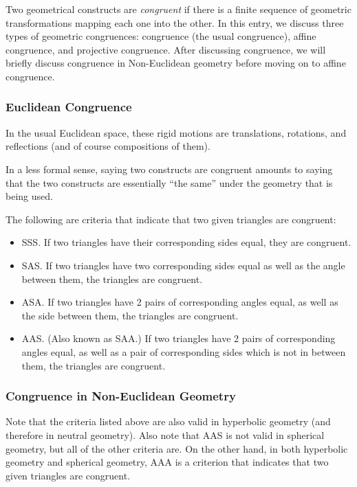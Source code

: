 \documentclass[12pt]{article}
\begin{document}

Two geometrical constructs are \emph{congruent} if there is a finite sequence of geometric transformations mapping each one into the other.  In this entry, we discuss three types of geometric congruences:  congruence (the usual congruence), affine congruence, and projective congruence.  After discussing  congruence, we will briefly discuss congruence in Non-Euclidean geometry before moving on to affine congruence.

\subsubsection*{Euclidean Congruence}
In the usual Euclidean space, these rigid motions are translations, rotations, and reflections (and of course compositions of them).

In a less formal sense, saying two constructs are congruent amounts to saying that the two constructs are essentially ``the same'' under the geometry that is being used.

The following are criteria that indicate that two given triangles are congruent:
\begin{itemize}
\item SSS. If two triangles have their corresponding sides equal, they are congruent.
\item SAS. If two triangles have two corresponding sides equal as well as the angle between them, the triangles are congruent.
\item ASA. If two triangles have 2 pairs of corresponding angles equal, as well as the side between them, the triangles are congruent.
\item AAS. (Also known as SAA.) If two triangles have 2 pairs of corresponding angles equal, as well as a pair of corresponding sides which is not in between them, the triangles are congruent.
\end{itemize}

\subsubsection*{Congruence in Non-Euclidean Geometry}

Note that the criteria listed above are also valid in hyperbolic geometry (and therefore in neutral geometry).  Also note that AAS is not valid in spherical geometry, but all of the other criteria are.  On the other hand, in both hyperbolic geometry and spherical geometry, AAA is a criterion that indicates that two given triangles are congruent.
\end{document}
